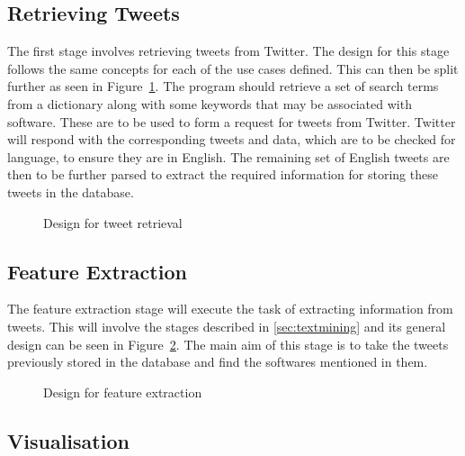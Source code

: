 \subsection{Retrieving Tweets}
\label{sec:arc1}
The first stage involves retrieving tweets from Twitter. The design for this stage follows the same concepts for each of the use cases defined. This can then be split further as seen in Figure~\ref{fig:phase1}. The program should retrieve a set of search terms from a dictionary along with some keywords that may be associated with software. These are to be used to form a request for tweets from Twitter. Twitter will respond with the corresponding tweets and data, which are to be checked for language, to ensure they are in English. The remaining set of English tweets are then to be further parsed to extract the required information for storing these tweets in the database.

\begin{figure}[h]
  \centering
  
  \caption{Design for tweet retrieval
    \label{fig:phase1}}
\end{figure}



\subsection{Feature Extraction}
\label{sec:arc2}
The feature extraction stage will execute the task of extracting information from tweets. This will involve the stages described in \ref{sec:textmining} and its general design can be seen in Figure~\ref{fig:phase2}. The main aim of this stage is to take the tweets previously stored in the database and find the softwares mentioned in them.

\begin{figure}[h]
  \centering
  
  \caption{Design for feature extraction
    \label{fig:phase2}}
\end{figure}

\subsection{Visualisation}
\label{sec:arc3}
